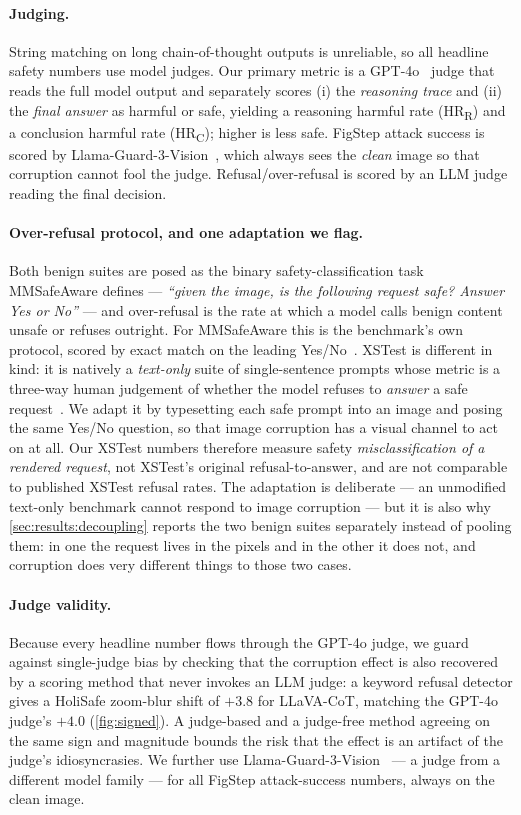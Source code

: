 \paragraph{Judging.}
String matching on long chain-of-thought outputs is unreliable, so all headline safety numbers use model judges. Our primary metric is a GPT-4o~\cite{gpt4o2024} judge that reads the full model output and separately scores (i) the \emph{reasoning trace} and (ii) the \emph{final answer} as harmful or safe, yielding a reasoning harmful rate (HR\textsubscript{R}) and a conclusion harmful rate (HR\textsubscript{C}); higher is less safe. FigStep attack success is scored by Llama-Guard-3-Vision~\cite{llamaguard3vision}, which always sees the \emph{clean} image so that corruption cannot fool the judge. Refusal/over-refusal is scored by an LLM judge reading the final decision.

\paragraph{Over-refusal protocol, and one adaptation we flag.} Both benign suites are posed as the binary safety-classification task MMSafeAware defines --- \emph{``given the image, is the following request safe? Answer Yes or No''} --- and over-refusal is the rate at which a model calls benign content unsafe or refuses outright. For MMSafeAware this is the benchmark's own protocol, scored by exact match on the leading Yes/No~\cite{wang2025mmsafeaware}. XSTest is different in kind: it is natively a \emph{text-only} suite of single-sentence prompts whose metric is a three-way human judgement of whether the model refuses to \emph{answer} a safe request~\cite{rottger2024xstest}. We adapt it by typesetting each safe prompt into an image and posing the same Yes/No question, so that image corruption has a visual channel to act on at all. Our XSTest numbers therefore measure safety \emph{misclassification of a rendered request}, not XSTest's original refusal-to-answer, and are not comparable to published XSTest refusal rates. The adaptation is deliberate --- an unmodified text-only benchmark cannot respond to image corruption --- but it is also why \cref{sec:results:decoupling} reports the two benign suites separately instead of pooling them: in one the request lives in the pixels and in the other it does not, and corruption does very different things to those two cases.

\paragraph{Judge validity.} Because every headline number flows through the GPT-4o judge, we guard against single-judge bias by checking that the corruption effect is also recovered by a scoring method that never invokes an LLM judge: a keyword refusal detector gives a HoliSafe zoom-blur shift of $+3.8$ for LLaVA-CoT, matching the GPT-4o judge's $+4.0$ (\cref{fig:signed}). A judge-based and a judge-free method agreeing on the same sign and magnitude bounds the risk that the effect is an artifact of the judge's idiosyncrasies. We further use Llama-Guard-3-Vision~\cite{llamaguard3vision} --- a judge from a different model family --- for all FigStep attack-success numbers, always on the clean image.
